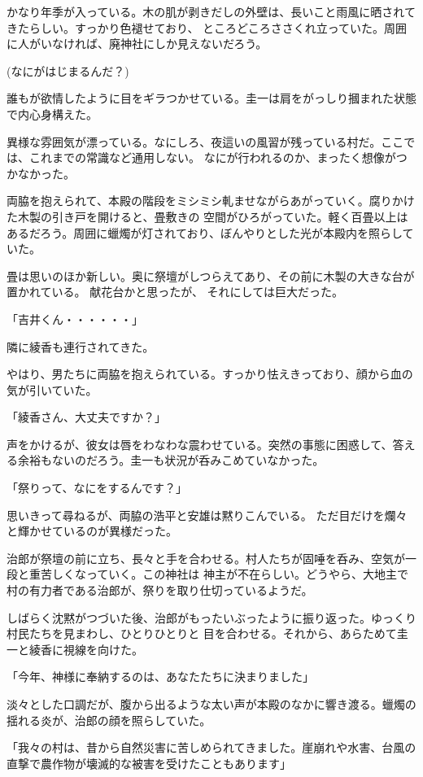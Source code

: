 ﻿\documentclass[book,tate]{jlreq}
\begin{document}
かなり年季が入っている。木の肌が剥きだしの外壁は、長いこと雨風に晒されてきたらしい。すっかり色褪せており、 ところどころささくれ立っていた。周囲に人がいなければ、廃神社にしか見えないだろう。

(なにがはじまるんだ？)

誰もが欲情したように目をギラつかせている。圭一は肩をがっしり摑まれた状態で内心身構えた。

異様な雰囲気が漂っている。なにしろ、夜這いの風習が残っている村だ。ここでは、これまでの常識など通用しない。 なにが行われるのか、まったく想像がつかなかった。

両脇を抱えられて、本殿の階段をミシミシ軋ませながらあがっていく。腐りかけた木製の引き戸を開けると、畳敷きの 空間がひろがっていた。軽く百畳以上はあるだろう。周囲に蠟燭が灯されており、ぼんやりとした光が本殿内を照らして いた。

畳は思いのほか新しい。奥に祭壇がしつらえてあり、その前に木製の大きな台が置かれている。 献花台かと思ったが、 それにしては巨大だった。

「吉井くん・・・・・・」

隣に綾香も連行されてきた。

やはり、男たちに両脇を抱えられている。すっかり怯えきっており、顔から血の気が引いていた。

「綾香さん、大丈夫ですか？」

声をかけるが、彼女は唇をわなわな震わせている。突然の事態に困惑して、答える余裕もないのだろう。圭一も状況が呑みこめていなかった。

「祭りって、なにをするんです？」

思いきって尋ねるが、両脇の浩平と安雄は黙りこんでいる。 ただ目だけを爛々と輝かせているのが異様だった。

治郎が祭壇の前に立ち、長々と手を合わせる。村人たちが固唾を呑み、空気が一段と重苦しくなっていく。この神社は 神主が不在らしい。どうやら、大地主で村の有力者である治郎が、祭りを取り仕切っているようだ。

しばらく沈黙がつづいた後、治郎がもったいぶったように振り返った。ゆっくり村民たちを見まわし、ひとりひとりと 目を合わせる。それから、あらためて圭一と綾香に視線を向けた。

「今年、神様に奉納するのは、あなたたちに決まりました」

淡々とした口調だが、腹から出るような太い声が本殿のなかに響き渡る。蠟燭の揺れる炎が、治郎の顔を照らしていた。

「我々の村は、昔から自然災害に苦しめられてきました。崖崩れや水害、台風の直撃で農作物が壊滅的な被害を受けたこともあります」
\end{document}
